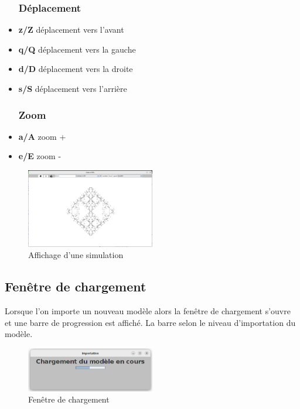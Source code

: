 \begin{itemize}
    \subsubsection{Déplacement}
    \item \textbf{z/Z} déplacement vers l'avant
    \item \textbf{q/Q} déplacement vers la gauche
    \item \textbf{d/D} déplacement vers la droite
    \item \textbf{s/S} déplacement vers l'arrière
    \subsubsection{Zoom}
    \item \textbf{a/A} zoom +
    \item \textbf{e/E} zoom -
\end{itemize}{}

\begin{figure}[H]
    \centering
    \includegraphics[width=0.5\textwidth]{images/imgInterface/simulation2.png}
    \caption{Affichage d'une simulation}
    \label{fig:simulation} 
\end{figure}

\subsection{Fenêtre de chargement}
\par Lorsque l'on importe un nouveau modèle alors la fenêtre de chargement s'ouvre et une barre de progression est affiché. La barre selon le niveau d'importation du modèle.

\begin{figure}[H]
    \centering
    \includegraphics[width=0.5\textwidth]{images/imgInterface/chargement.png}
    \caption{Fenêtre de chargement}
    \label{fig:chargement} 
\end{figure}
